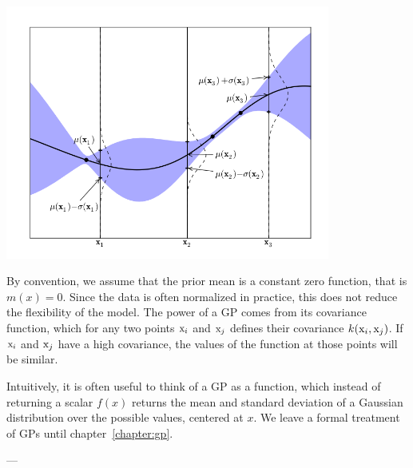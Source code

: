 \begin{center}
  \includegraphics[width=0.8\textwidth]{images/gp-1d.png}
\end{center}

By convention, we assume that the prior mean is a constant zero function, that
is $m(x) = 0$. Since the data is often normalized in practice, this does not
reduce the flexibility of the model. The power of a GP comes from its
covariance function, which for any two points ${\textnormal{x}}_i$ and ${\textnormal{x}}_j$ defines their
covariance $k({\textnormal{x}}_i, {\textnormal{x}}_j)$. If ${\textnormal{x}}_i$ and ${\textnormal{x}}_j$ have a high covariance,
the values of the function at those points will be similar.

Intuitively, it is often useful to think of a GP as a function, which instead
of returning a scalar $f(x)$ returns the mean and standard deviation of a
Gaussian distribution over the possible values, centered at $x$. We leave a formal
treatment of GPs until chapter~\ref{chapter:gp}.

---


%
%
%
%
%


